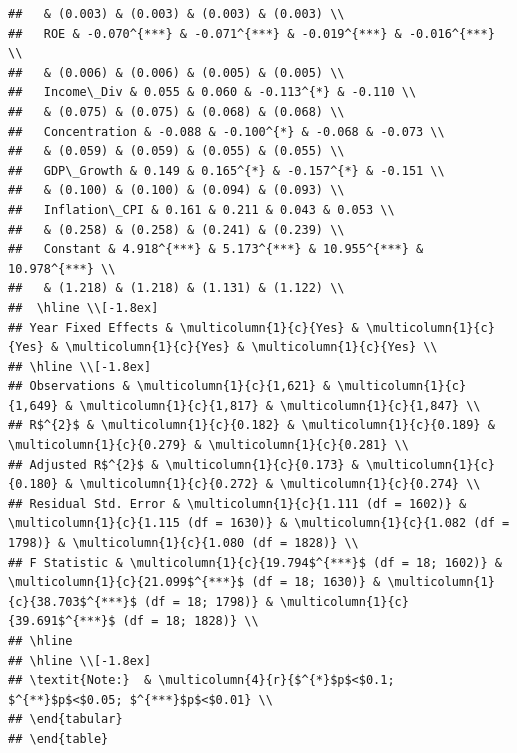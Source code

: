 \documentclass{article}
\begin{document}
\begin{verbatim}
##   & (0.003) & (0.003) & (0.003) & (0.003) \\ 
##   ROE & -0.070^{***} & -0.071^{***} & -0.019^{***} & -0.016^{***} \\ 
##   & (0.006) & (0.006) & (0.005) & (0.005) \\ 
##   Income\_Div & 0.055 & 0.060 & -0.113^{*} & -0.110 \\ 
##   & (0.075) & (0.075) & (0.068) & (0.068) \\ 
##   Concentration & -0.088 & -0.100^{*} & -0.068 & -0.073 \\ 
##   & (0.059) & (0.059) & (0.055) & (0.055) \\ 
##   GDP\_Growth & 0.149 & 0.165^{*} & -0.157^{*} & -0.151 \\ 
##   & (0.100) & (0.100) & (0.094) & (0.093) \\ 
##   Inflation\_CPI & 0.161 & 0.211 & 0.043 & 0.053 \\ 
##   & (0.258) & (0.258) & (0.241) & (0.239) \\ 
##   Constant & 4.918^{***} & 5.173^{***} & 10.955^{***} & 10.978^{***} \\ 
##   & (1.218) & (1.218) & (1.131) & (1.122) \\ 
##  \hline \\[-1.8ex] 
## Year Fixed Effects & \multicolumn{1}{c}{Yes} & \multicolumn{1}{c}{Yes} & \multicolumn{1}{c}{Yes} & \multicolumn{1}{c}{Yes} \\ 
## \hline \\[-1.8ex] 
## Observations & \multicolumn{1}{c}{1,621} & \multicolumn{1}{c}{1,649} & \multicolumn{1}{c}{1,817} & \multicolumn{1}{c}{1,847} \\ 
## R$^{2}$ & \multicolumn{1}{c}{0.182} & \multicolumn{1}{c}{0.189} & \multicolumn{1}{c}{0.279} & \multicolumn{1}{c}{0.281} \\ 
## Adjusted R$^{2}$ & \multicolumn{1}{c}{0.173} & \multicolumn{1}{c}{0.180} & \multicolumn{1}{c}{0.272} & \multicolumn{1}{c}{0.274} \\ 
## Residual Std. Error & \multicolumn{1}{c}{1.111 (df = 1602)} & \multicolumn{1}{c}{1.115 (df = 1630)} & \multicolumn{1}{c}{1.082 (df = 1798)} & \multicolumn{1}{c}{1.080 (df = 1828)} \\ 
## F Statistic & \multicolumn{1}{c}{19.794$^{***}$ (df = 18; 1602)} & \multicolumn{1}{c}{21.099$^{***}$ (df = 18; 1630)} & \multicolumn{1}{c}{38.703$^{***}$ (df = 18; 1798)} & \multicolumn{1}{c}{39.691$^{***}$ (df = 18; 1828)} \\ 
## \hline 
## \hline \\[-1.8ex] 
## \textit{Note:}  & \multicolumn{4}{r}{$^{*}$p$<$0.1; $^{**}$p$<$0.05; $^{***}$p$<$0.01} \\ 
## \end{tabular} 
## \end{table}
\end{verbatim}
\end{document}
